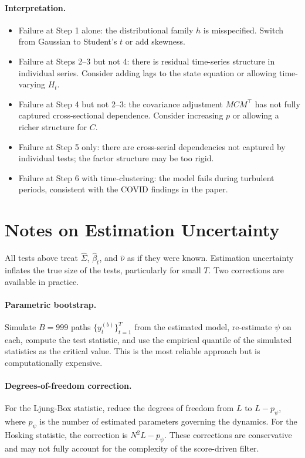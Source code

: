 \documentclass[12pt]{article}
\begin{document}
\paragraph{Interpretation.}
\begin{itemize}
    \item Failure at Step 1 alone: the distributional family $h$ is misspecified.
        Switch from Gaussian to Student's $t$ or add skewness.
    \item Failure at Steps 2--3 but not 4: there is residual time-series structure
        in individual series. Consider adding lags to the state equation or allowing
        time-varying $H_t$.
    \item Failure at Step 4 but not 2--3: the covariance adjustment $M C M^\top$
        has not fully captured cross-sectional dependence. Consider increasing $p$
        or allowing a richer structure for $C$.
    \item Failure at Step 5 only: there are cross-serial dependencies not captured
        by individual tests; the factor structure may be too rigid.
    \item Failure at Step 6 with time-clustering: the model fails during turbulent
        periods, consistent with the COVID findings in the paper.
\end{itemize}

\section{Notes on Estimation Uncertainty}

All tests above treat $\hat{\Sigma}$, $\hat{\beta}_t$, and $\hat{\nu}$ as if they were
known. Estimation uncertainty inflates the true size of the tests, particularly for small
$T$. Two corrections are available in practice.

\paragraph{Parametric bootstrap.} Simulate $B = 999$ paths
$\{y_t^{(b)}\}_{t=1}^T$ from the estimated model, re-estimate $\psi$ on each, compute
the test statistic, and use the empirical quantile of the simulated statistics as the
critical value. This is the most reliable approach but is computationally expensive.

\paragraph{Degrees-of-freedom correction.} For the Ljung-Box statistic, reduce
the degrees of freedom from $L$ to $L - p_\psi$, where $p_\psi$ is the number of
estimated parameters governing the dynamics. For the Hosking statistic, the correction
is $N^2 L - p_\psi$. These corrections are conservative and may not fully account for
the complexity of the score-driven filter.
\end{document}

